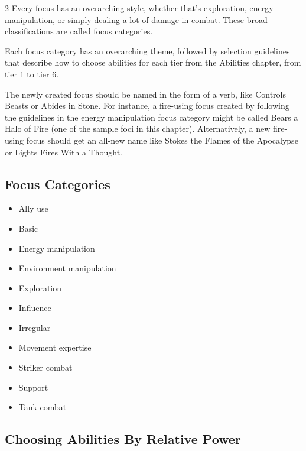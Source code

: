 \begin{multicols}{2}
Every focus has an overarching style, whether that’s exploration, energy manipulation, or simply dealing a lot of damage in combat. These broad classifications are called focus categories.

Each focus category has an overarching theme, followed by selection guidelines that describe how to choose abilities for each tier from the Abilities chapter, from tier 1 to tier 6. 

The newly created focus should be named in the form of a verb, like Controls Beasts or Abides in Stone. For instance, a fire-using focus created by following the guidelines in the energy manipulation focus category might be called Bears a Halo of Fire (one of the sample foci in this chapter). Alternatively, a new fire-using focus should get an all-new name like Stokes the Flames of the Apocalypse or Lights Fires With a Thought.

\subsection{Focus Categories}

\begin{itemize} 
\item Ally use 

\item Basic 

\item Energy manipulation 

\item Environment manipulation 

\item Exploration 

\item Influence 

\item Irregular 

\item Movement expertise 

\item Striker combat 

\item Support 

\item Tank combat
\end{itemize} 


\subsection{Choosing Abilities By Relative Power}


\end{multicols}
